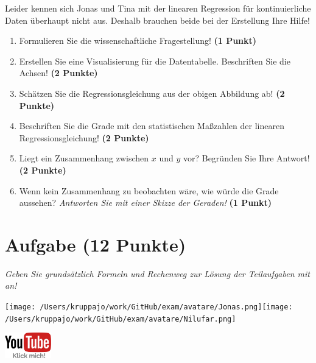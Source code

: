 \documentclass[a4paper, 9pt]{scrartcl}\usepackage[]{graphicx}\usepackage[]{xcolor}
\begin{document}
Leider kennen sich Jonas und Tina mit der linearen Regression für kontinuierliche Daten überhaupt nicht aus. Deshalb brauchen beide bei der Erstellung Ihre Hilfe!

\begin{enumerate}
\item Formulieren Sie die wissenschaftliche Fragestellung! \textbf{(1 Punkt)}
\item Erstellen  Sie  eine  Visualisierung  für  die  Datentabelle.  Beschriften  Sie  die  Achsen! \textbf{(2 Punkte)}
\item Schätzen Sie die Regressionsgleichung aus der obigen Abbildung ab! \textbf{(2 Punkte)}
\item Beschriften Sie die Grade mit den statistischen Maßzahlen der linearen Regressionsgleichung! \textbf{(2 Punkte)}
\item Liegt ein Zusammenhang zwischen $x$ und $y$ vor? Begründen Sie Ihre Antwort! \textbf{(2 Punkte)}
\item Wenn kein Zusammenhang zu beobachten wäre, wie würde die Grade aussehen? \textit{Antworten Sie mit einer Skizze der Geraden!} \textbf{(1 Punkt)}
\end{enumerate} 
\clearpage

\section{Aufgabe \hfill (12 Punkte)}

\textit{Geben Sie grundsätzlich Formeln und Rechenweg zur Lösung der Teilaufgaben mit an!} \\[1Ex]
 

 
\begin{minipage}[t]{0.5\textwidth}
\texttt{[image: /Users/kruppajo/work/GitHub/exam/avatare/Jonas.png]}\hspace{-4mm}\texttt{[image: /Users/kruppajo/work/GitHub/exam/avatare/Nilufar.png]}
\end{minipage}
\begin{minipage}[t]{0.5\textwidth}
\hfill
\href{https://youtu.be/lJp8rFmMnrs}{\includegraphics[width = 2cm]{img/youtube}}
\end{minipage}
\end{document}
